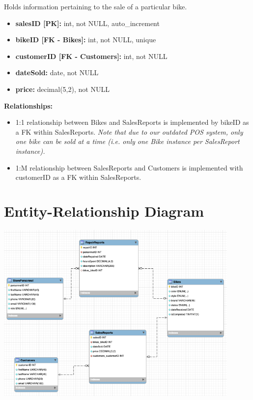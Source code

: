\documentclass{article}
\begin{document}
\begin{tcolorbox}[colback=secondarycolor, colframe=primarycolor, title=\textbf{SalesReports Table}]
Holds information pertaining to the sale of a particular bike.
\vspace{0.2cm}

\begin{itemize}
  \item \textbf{salesID [PK]:} int, not NULL, auto\_increment
  \item \textbf{bikeID [FK - Bikes]:} int, not NULL, unique
  \item \textbf{customerID [FK - Customers]:} int, not NULL
  \item \textbf{dateSold:} date, not NULL
  \item \textbf{price:} decimal(5,2), not NULL
\end{itemize}
\vspace{0.2cm}

\textbf{Relationships:}
\vspace{0.2cm}
\begin{itemize}
  \item 1:1 relationship between Bikes and SalesReports is implemented by bikeID as a FK within SalesReports. \textit{Note that due to our outdated POS system, only one bike can be sold at a time (i.e. only one Bike instance per SalesReport instance).}
  \item 1:M relationship between SalesReports and Customers is implemented with customerID as a FK within SalesReports.
\end{itemize}
\end{tcolorbox}

\vspace{0.5cm}

\section{Entity-Relationship Diagram}

\begin{tcolorbox}[colback=secondarycolor, colframe=primarycolor, arc=5mm]

\begin{center}
\vspace{0.5cm}
 \includegraphics[width=0.9\textwidth]{ERD.png}
\end{center}
\end{tcolorbox}
\end{document}

